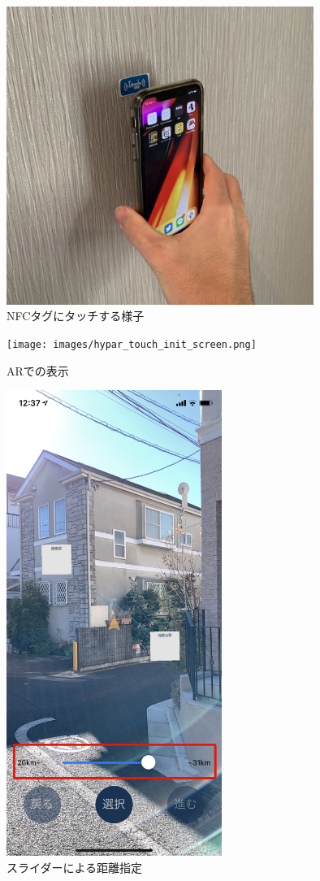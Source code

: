 \begin{figure}[h]
  \centering
  \includegraphics[width=100mm]{images/touch_nfc.jpg}
  \caption{NFCタグにタッチする様子} \label{fig:touch_nfc}
\end{figure}

\begin{figure}[h]
  \begin{minipage}{0.5\hsize}
    \centering
    \texttt{[image: images/hypar\_touch\_init\_screen.png]}
    \caption{ARでの表示} \label{fig:hypar_touch_init_screen}
  \end{minipage}
  \begin{minipage}{0.5\hsize}
    \centering
    \includegraphics[width=70mm]{images/hypar_touch_slider.png}
    \caption{スライダーによる距離指定} \label{fig:hypar_touch_slider}
  \end{minipage}
\end{figure}


